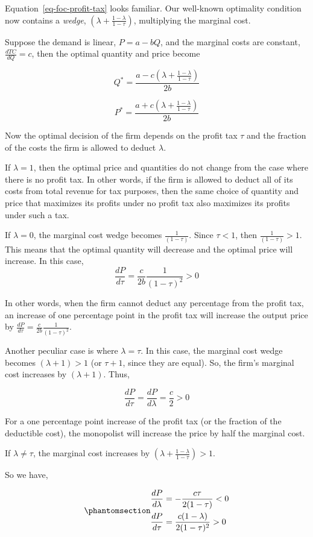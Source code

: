 \documentclass[
]{article}
\begin{document}
Equation~\ref{eq-foc-profit-tax} looks familiar. Our well-known
optimality condition now contains a \emph{wedge},
\(\left(\lambda + \frac{1-\lambda}{1-\tau}\right)\), multiplying the
marginal cost.

Suppose the demand is linear, \(P=a-bQ\), and the marginal costs are
constant, \(\frac{dTC}{dQ}=c\), then the optimal quantity and price
become

\[
Q^*=\frac{a-c\left(\lambda + \frac{1-\lambda}{1-\tau}\right)}{2b}
\]

\[
P^*=\frac{a+c\left(\lambda + \frac{1-\lambda}{1-\tau}\right)}{2b}
\]

Now the optimal decision of the firm depends on the profit tax \(\tau\)
and the fraction of the costs the firm is allowed to deduct \(\lambda\).

If \(\lambda=1\), then the optimal price and quantities do not change
from the case where there is no profit tax. In other words, if the firm
is allowed to deduct all of its costs from total revenue for tax
purposes, then the same choice of quantity and price that maximizes its
profits under no profit tax also maximizes its profits under such a tax.

If \(\lambda=0\), the marginal cost wedge becomes
\(\frac{1}{(1-\tau)}\). Since \(\tau<1\), then \(\frac{1}{(1-\tau)}>1\).
This means that the optimal quantity will decrease and the optimal price
will increase. In this case, \[
\frac{dP}{d\tau}=\frac{c}{2b}\frac{1}{(1-\tau)^2} > 0
\]

In other words, when the firm cannot deduct any percentage from the
profit tax, an increase of one percentage point in the profit tax will
increase the output price by
\(\frac{dP}{d\tau}=\frac{c}{2b}\frac{1}{(1-\tau)^2}\).

Another peculiar case is where \(\lambda=\tau\). In this case, the
marginal cost wedge becomes \((\lambda+1)>1\) (or \(\tau+1\), since they
are equal). So, the firm's marginal cost increases by \((\lambda+1)\).
Thus,

\[
\frac{dP}{d\tau}=\frac{dP}{d\lambda}=\frac{c}{2}>0
\]

For a one percentage point increase of the profit tax (or the fraction
of the deductible cost), the monopolist will increase the price by half
the marginal cost.

If \(\lambda\not=\tau\), the marginal cost increases by
\(\left(\lambda + \frac{1-\lambda}{1-\tau}\right)>1\).

So we have,

\begin{equation}\phantomsection\label{eq-dpdt-profit}{
\begin{aligned}
\frac{dP}{d\lambda} &= -\frac{c\tau}{2(1-\tau)} < 0\\
\frac{dP}{d\tau} &= \frac{c(1-\lambda)}{2(1-\tau)^2} > 0
\end{aligned}
}\end{equation}
\end{document}
